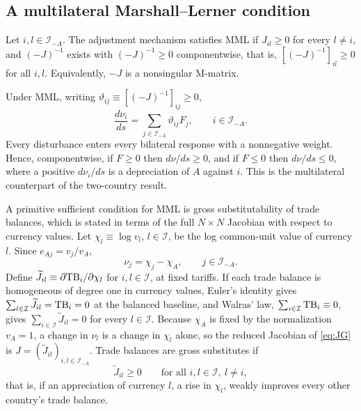 \subsection{A multilateral Marshall--Lerner condition}
\label{sec:mml}

\begin{definition}
\label{def:mml}
Let $i,l\in\mathcal I_{-A}$. The adjustment mechanism satisfies MML if $J_{il}\geq0$ for every $l\neq i$, and $(-J)^{-1}$ exists with $(-J)^{-1}\geq0$ componentwise, that is, $[(-J)^{-1}]_{il}\geq0$ for all $i,l$. Equivalently, $-J$ is a nonsingular M-matrix.
\end{definition}

Under MML, writing $\vartheta_{ij}\equiv[(-J)^{-1}]_{ij}\geq0$,
\begin{equation}
\frac{d\nu_i}{ds}=\sum_{j\in\mathcal I_{-A}}\vartheta_{ij}F_j,\qquad i\in\mathcal I_{-A}.
\label{eq:signrule}
\end{equation}
Every disturbance enters every bilateral response with a nonnegative weight. Hence, componentwise, if $F\geq0$ then $d\nu/ds\geq0$, and if $F\leq0$ then $d\nu/ds\leq0$, where a positive $d\nu_i/ds$ is a depreciation of $A$ against $i$. This is the multilateral counterpart of the two-country result.

A primitive sufficient condition for MML is gross substitutability of trade balances, which is stated in terms of the full $N\times N$ Jacobian with respect to currency values. Let $\chi_l\equiv\log v_l$, $l\in\mathcal I$, be the log common-unit value of currency $l$. Since $e_{Aj}=v_j/v_A$,
\begin{equation*}
\nu_j=\chi_j-\chi_A,\qquad j\in\mathcal I_{-A}.
\end{equation*}
Define $\widetilde J_{il}\equiv\partial\mathrm{TB}_i/\partial\chi_l$ for $i,l\in\mathcal I$, at fixed tariffs. If each trade balance is homogeneous of degree one in currency values, Euler's identity gives $\sum_{l\in\mathcal I}\widetilde J_{il}=\mathrm{TB}_i=0$ at the balanced baseline, and Walras' law, $\sum_{i\in\mathcal I}\mathrm{TB}_i\equiv0$, gives $\sum_{i\in\mathcal I}\widetilde J_{il}=0$ for every $l\in\mathcal I$. Because $\chi_A$ is fixed by the normalization $v_A=1$, a change in $\nu_l$ is a change in $\chi_l$ alone, so the reduced Jacobian of \cref{eq:JG} is $J=(\widetilde J_{il})_{i,l\in\mathcal I_{-A}}$. Trade balances are gross substitutes if
\begin{equation*}
\widetilde J_{il}\geq0\qquad\text{for all }i,l\in\mathcal I,\ l\neq i,
\end{equation*}
that is, if an appreciation of currency $l$, a rise in $\chi_l$, weakly improves every other country's trade balance.

